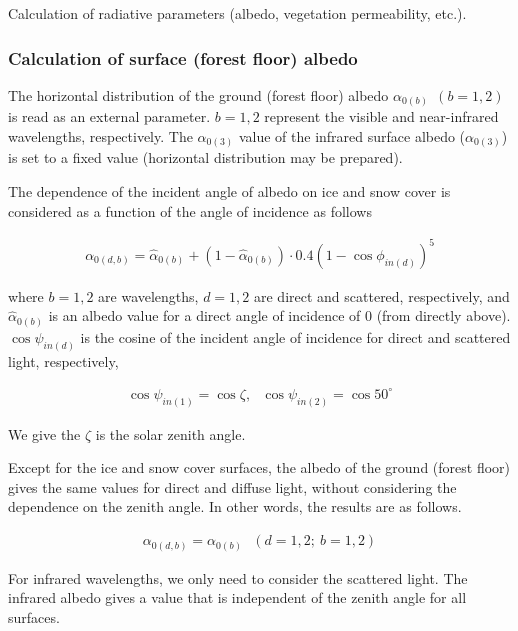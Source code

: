 Calculation of radiative parameters (albedo, vegetation permeability,
etc.).

\hypertarget{calculation-of-surface-forest-floor-albedo}{%
\subsubsection{Calculation of surface (forest floor)
albedo}\label{calculation-of-surface-forest-floor-albedo}}

The horizontal distribution of the ground (forest floor) albedo
\(\alpha_{0(b)}\ \ (b=1,2)\) is read as an external parameter.
\(b=1, 2\) represent the visible and near-infrared wavelengths,
respectively. The \(\alpha_{0(3)}\) value of the infrared surface albedo
(\(\alpha_{0(3)}\)) is set to a fixed value (horizontal distribution may
be prepared).

The dependence of the incident angle of albedo on ice and snow cover is
considered as a function of the angle of incidence as follows

\begin{eqnarray}
 \alpha_{0(d,b)} = \hat{\alpha}_{0(b)} + ( 1 - \hat{\alpha}_{0(b)} )
                         \cdot 0.4 ( 1 - \cos \phi_{in(d)} )^5
\end{eqnarray}

where \(b=1,2\) are wavelengths, \(d=1,2\) are direct and scattered,
respectively, and \(\hat{\alpha}_{0(b)}\) is an albedo value for a
direct angle of incidence of \(0\) (from directly above).
\(\cos \psi_{in(d)}\) is the cosine of the incident angle of incidence
for direct and scattered light, respectively,

\begin{eqnarray}
 \cos\psi_{in(1)} = \cos\zeta, \ \ \
 \cos\psi_{in(2)} = \cos 50^{\circ}
\end{eqnarray}

We give the \(\zeta\) is the solar zenith angle.

Except for the ice and snow cover surfaces, the albedo of the ground
(forest floor) gives the same values for direct and diffuse light,
without considering the dependence on the zenith angle. In other words,
the results are as follows.

\begin{eqnarray}
 \alpha_{0(d,b)} = \alpha_{0(b)}\ \ \ (d=1,2;\ b=1,2)
\end{eqnarray}

For infrared wavelengths, we only need to consider the scattered light.
The infrared albedo gives a value that is independent of the zenith
angle for all surfaces.

